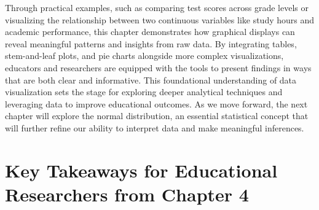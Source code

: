 \documentclass[
  letterpaper,
  DIV=11,
  numbers=noendperiod]{scrreprt}
\begin{document}
Through practical examples, such as comparing test scores across grade
levels or visualizing the relationship between two continuous variables
like study hours and academic performance, this chapter demonstrates how
graphical displays can reveal meaningful patterns and insights from raw
data. By integrating tables, stem-and-leaf plots, and pie charts
alongside more complex visualizations, educators and researchers are
equipped with the tools to present findings in ways that are both clear
and informative. This foundational understanding of data visualization
sets the stage for exploring deeper analytical techniques and leveraging
data to improve educational outcomes. As we move forward, the next
chapter will explore the normal distribution, an essential statistical
concept that will further refine our ability to interpret data and make
meaningful inferences.

\section*{Key Takeaways for Educational Researchers from Chapter
4}\label{key-takeaways-for-educational-researchers-from-chapter-4}

\end{document}
